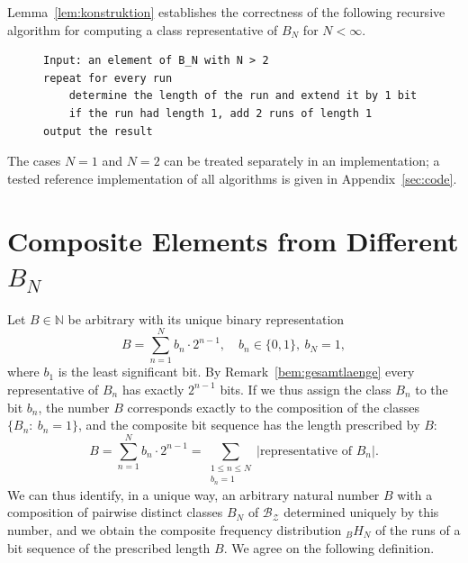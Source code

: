 \documentclass[11pt,a4paper]{scrartcl}
\theoremstyle{plain}
\theoremstyle{definition}
\theoremstyle{remark}
\begin{document}
\noindent Lemma~\ref{lem:konstruktion} establishes the correctness of
the following recursive algorithm for computing a class
representative of $B_N$ for $N<\infty$.

\begin{figure}[htbp]
\begin{lstlisting}[caption={Recursive computation of a bit sequence from a B\_N},label={algo:rekursiv}]
Input: an element of B_N with N > 2
repeat for every run
    determine the length of the run and extend it by 1 bit
    if the run had length 1, add 2 runs of length 1
output the result
\end{lstlisting}
\end{figure}

The cases $N=1$ and $N=2$ can be treated separately in an
implementation; a tested reference implementation of all algorithms is
given in Appendix~\ref{sec:code}.

\section{Composite Elements from Different
\texorpdfstring{$B_N$}{B\_N}}\label{sec:zusammengesetzt}

Let $B\in\mathbb N$ be arbitrary with its unique binary
representation
\begin{equation}\label{eqn:bindarstellung}
  B = \sum_{n=1}^{N} b_n\cdot 2^{n-1},\quad b_n\in\{0,1\},\ b_N=1,
\end{equation}
where $b_1$ is the least significant bit. By
Remark~\ref{bem:gesamtlaenge} every representative of $B_n$ has
exactly $2^{n-1}$ bits. If we thus assign the class $B_n$ to the bit
$b_n$, the number $B$ corresponds exactly to the composition of the
classes $\{B_n:\ b_n=1\}$, and the composite bit sequence has the
length prescribed by $B$:
\begin{equation}\label{eqn:bsummelaufehaeufigkeit}
  B = \sum_{n=1}^{N} b_n\cdot 2^{n-1}
  = \sum_{\substack{1\leq n\leq N\\ b_n=1}}
  \left|\text{representative of } B_n\right|.
\end{equation}
We can thus identify, in a unique way, an arbitrary natural number
$B$ with a composition of pairwise distinct classes $B_N$ of
$\mathcal{B_Z}$ determined uniquely by this number, and we obtain the
composite frequency distribution $_BH_N$ of the runs of a bit
sequence of the prescribed length $B$. We agree on the following
definition.
\end{document}
